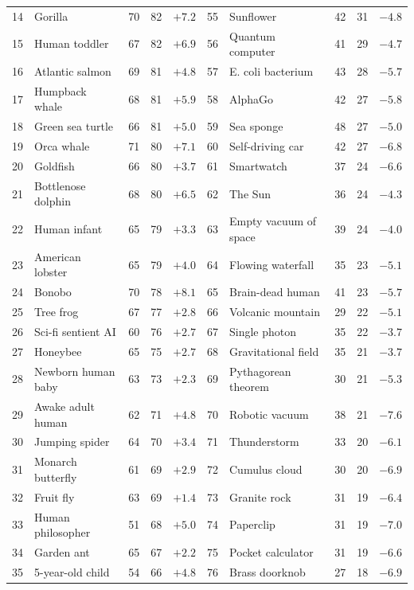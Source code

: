 \documentclass[10pt,twocolumn]{article}
\begin{document}
\begin{table}[t]
{\begin{tabular}{rlrrr|rlrrr}
14 & Gorilla & 70 & 82 & $+7.2$ & 55 & Sunflower & 42 & 31 & $-4.8$ \\
15 & Human toddler & 67 & 82 & $+6.9$ & 56 & Quantum computer & 41 & 29 & $-4.7$ \\
16 & Atlantic salmon & 69 & 81 & $+4.8$ & 57 & E. coli bacterium & 43 & 28 & $-5.7$ \\
17 & Humpback whale & 68 & 81 & $+5.9$ & 58 & AlphaGo & 42 & 27 & $-5.8$ \\
18 & Green sea turtle & 66 & 81 & $+5.0$ & 59 & Sea sponge & 48 & 27 & $-5.0$ \\
19 & Orca whale & 71 & 80 & $+7.1$ & 60 & Self-driving car & 42 & 27 & $-6.8$ \\
20 & Goldfish & 66 & 80 & $+3.7$ & 61 & Smartwatch & 37 & 24 & $-6.6$ \\
21 & Bottlenose dolphin & 68 & 80 & $+6.5$ & 62 & The Sun & 36 & 24 & $-4.3$ \\
22 & Human infant & 65 & 79 & $+3.3$ & 63 & Empty vacuum of space & 39 & 24 & $-4.0$ \\
23 & American lobster & 65 & 79 & $+4.0$ & 64 & Flowing waterfall & 35 & 23 & $-5.1$ \\
24 & Bonobo & 70 & 78 & $+8.1$ & 65 & Brain-dead human & 41 & 23 & $-5.7$ \\
25 & Tree frog & 67 & 77 & $+2.8$ & 66 & Volcanic mountain & 29 & 22 & $-5.1$ \\
26 & Sci-fi sentient AI & 60 & 76 & $+2.7$ & 67 & Single photon & 35 & 22 & $-3.7$ \\
27 & Honeybee & 65 & 75 & $+2.7$ & 68 & Gravitational field & 35 & 21 & $-3.7$ \\
28 & Newborn human baby & 63 & 73 & $+2.3$ & 69 & Pythagorean theorem & 30 & 21 & $-5.3$ \\
29 & Awake adult human & 62 & 71 & $+4.8$ & 70 & Robotic vacuum & 38 & 21 & $-7.6$ \\
30 & Jumping spider & 64 & 70 & $+3.4$ & 71 & Thunderstorm & 33 & 20 & $-6.1$ \\
31 & Monarch butterfly & 61 & 69 & $+2.9$ & 72 & Cumulus cloud & 30 & 20 & $-6.9$ \\
32 & Fruit fly & 63 & 69 & $+1.4$ & 73 & Granite rock & 31 & 19 & $-6.4$ \\
33 & Human philosopher & 51 & 68 & $+5.0$ & 74 & Paperclip & 31 & 19 & $-7.0$ \\
34 & Garden ant & 65 & 67 & $+2.2$ & 75 & Pocket calculator & 31 & 19 & $-6.6$ \\
35 & 5-year-old child & 54 & 66 & $+4.8$ & 76 & Brass doorknob & 27 & 18 & $-6.9$ \\

\end{tabular}}
\end{table}
\end{document}
